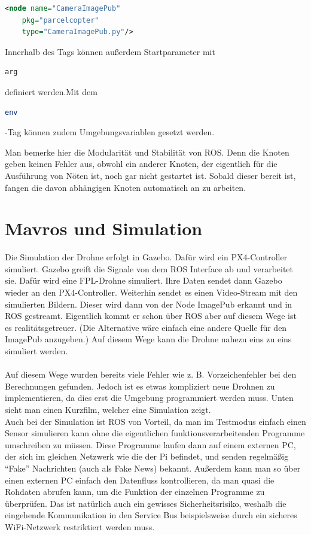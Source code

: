 \begin{lstlisting}[language=xml]
<node name="CameraImagePub" 
	pkg="parcelcopter" 
	type="CameraImagePub.py"/>\end{lstlisting}

Innerhalb des Tags können außerdem Startparameter mit 

\begin{lstlisting}[language=bash]
arg
\end{lstlisting}

definiert werden.Mit dem 

\begin{lstlisting}[language=bash]
env
\end{lstlisting}-Tag können zudem Umgebungsvariablen gesetzt werden.

Man bemerke hier die Modularität und Stabilität von ROS. Denn die Knoten geben keinen Fehler aus, obwohl ein anderer Knoten, der eigentlich für die Ausführung von Nöten ist, noch gar nicht gestartet ist. Sobald dieser bereit ist, fangen die davon abhängigen Knoten automatisch an zu arbeiten. 

\section{Mavros und Simulation}
Die Simulation der Drohne erfolgt in Gazebo. Dafür wird ein PX4-Controller simuliert. Gazebo greift die Signale von dem ROS Interface ab und verarbeitet sie. Dafür wird eine FPL-Drohne simuliert. Ihre Daten sendet dann Gazebo wieder an den PX4-Controller. Weiterhin sendet es einen Video-Stream mit den simulierten Bildern. Dieser wird dann von der Node ImagePub erkannt und in ROS gestreamt. Eigentlich kommt er schon über ROS aber auf diesem Wege ist es realitätsgetreuer. (Die Alternative wäre einfach eine andere Quelle für den ImagePub anzugeben.) Auf diesem Wege kann die Drohne nahezu eins zu eins simuliert werden. \\
\\
Auf diesem Wege wurden bereits viele Fehler wie z. B. Vorzeichenfehler bei den Berechnungen gefunden. Jedoch ist es etwas kompliziert neue Drohnen zu implementieren, da dies erst die Umgebung programmiert werden muss. Unten sieht man einen Kurzfilm, welcher eine Simulation zeigt.
\\
Auch bei der Simulation ist ROS von Vorteil, da man im Testmodus einfach einen Sensor simulieren kann ohne die eigentlichen funktionsverarbeitenden Programme umschreiben zu müssen. Diese Programme laufen dann auf einem externen PC, der sich im gleichen Netzwerk wie die der Pi befindet, und senden regelmäßig ``Fake'' Nachrichten (auch als Fake News) bekannt.
Außerdem kann man so über einen externen PC einfach den Datenfluss kontrollieren, da man quasi die Rohdaten abrufen kann, um die Funktion der einzelnen Programme zu überprüfen. Das ist natürlich auch ein gewisses Sicherheitsrisiko, weshalb die eingehende Kommunikation in den Service Bus beispielsweise durch ein sicheres WiFi-Netzwerk restriktiert werden muss. 
